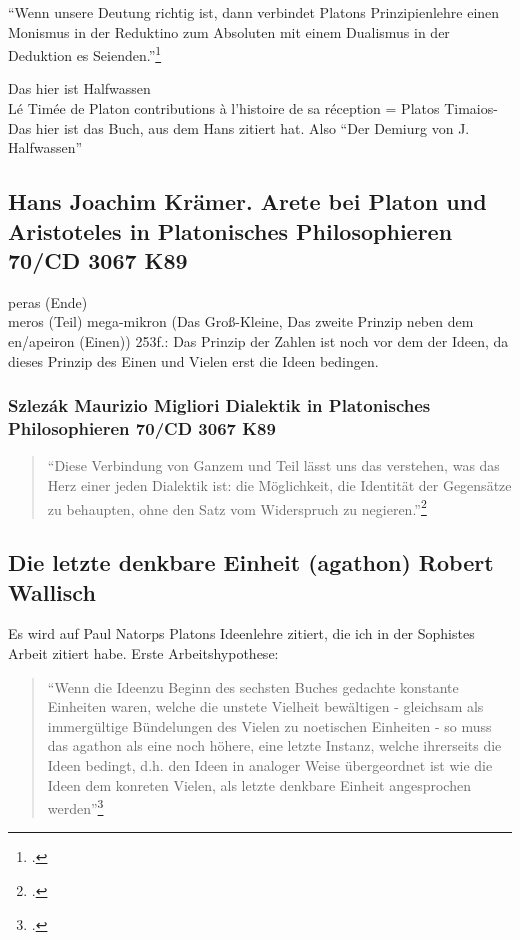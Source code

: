 \documentclass[12pt]{article}
\newcommand*{\zitatblock}[1]{%
    \begin{quote}
    \fontsize{10}{12}\selectfont
    \setlength{\parskip}{1.0em}
    #1
    \end{quote}
}
\begin{document}
\enquote{Wenn unsere Deutung richtig ist, dann verbindet Platons Prinzipienlehre einen Monismus in der Reduktino zum Absoluten mit einem Dualismus in der Deduktion es Seienden.}\footcite[][S. 79]{HalfwassenMonismusDualismus}


Das hier ist Halfwassen\\
Lé Timée de Platon contributions à l'histoire de sa réception = Platos Timaios- Das hier ist das Buch, aus dem Hans zitiert hat. Also \enquote{Der Demiurg von J. Halfwassen}
\subsection*{Hans Joachim Krämer. Arete bei Platon und Aristoteles in Platonisches Philosophieren 70/CD 3067 K89}
peras (Ende)\\
meros (Teil)
mega-mikron (Das Groß-Kleine, Das zweite Prinzip neben dem en/apeiron (Einen))
253f.: Das Prinzip der Zahlen ist noch vor dem der Ideen, da dieses Prinzip des Einen und Vielen erst die Ideen bedingen. 

\subsubsection*{Szlezák Maurizio Migliori Dialektik in Platonisches Philosophieren 70/CD 3067 K89}
\zitatblock{\enquote{Diese Verbindung von Ganzem und Teil lässt uns das verstehen, was das Herz einer jeden Dialektik ist: die Möglichkeit, die Identität der Gegensätze zu behaupten, ohne den Satz vom Widerspruch zu negieren.}\footcite[][S. 150]{Migliori}}

\subsection*{Die letzte denkbare Einheit (agathon) Robert Wallisch}
Es wird auf Paul Natorps Platons Ideenlehre zitiert, die ich in der Sophistes Arbeit zitiert habe. 
Erste Arbeitshypothese: \zitatblock{\enquote{Wenn die Ideenzu Beginn des sechsten Buches gedachte konstante Einheiten waren, welche die unstete Vielheit bewältigen - gleichsam als immergültige Bündelungen des Vielen zu noetischen Einheiten - so muss das agathon als eine noch höhere, eine letzte Instanz, welche ihrerseits die Ideen bedingt, d.h. den Ideen in analoger Weise übergeordnet ist wie die Ideen dem konreten Vielen, als letzte denkbare Einheit angesprochen werden}\footcite[][S. 10]{Wallisch}}
\end{document}
